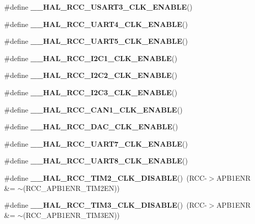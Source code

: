 \begin{DoxyCompactItemize}
\item 
\#define {\bfseries \+\_\+\+\_\+\+H\+A\+L\+\_\+\+R\+C\+C\+\_\+\+U\+S\+A\+R\+T3\+\_\+\+C\+L\+K\+\_\+\+E\+N\+A\+B\+LE}()
\item 
\#define {\bfseries \+\_\+\+\_\+\+H\+A\+L\+\_\+\+R\+C\+C\+\_\+\+U\+A\+R\+T4\+\_\+\+C\+L\+K\+\_\+\+E\+N\+A\+B\+LE}()
\item 
\#define {\bfseries \+\_\+\+\_\+\+H\+A\+L\+\_\+\+R\+C\+C\+\_\+\+U\+A\+R\+T5\+\_\+\+C\+L\+K\+\_\+\+E\+N\+A\+B\+LE}()
\item 
\#define {\bfseries \+\_\+\+\_\+\+H\+A\+L\+\_\+\+R\+C\+C\+\_\+\+I2\+C1\+\_\+\+C\+L\+K\+\_\+\+E\+N\+A\+B\+LE}()
\item 
\#define {\bfseries \+\_\+\+\_\+\+H\+A\+L\+\_\+\+R\+C\+C\+\_\+\+I2\+C2\+\_\+\+C\+L\+K\+\_\+\+E\+N\+A\+B\+LE}()
\item 
\#define {\bfseries \+\_\+\+\_\+\+H\+A\+L\+\_\+\+R\+C\+C\+\_\+\+I2\+C3\+\_\+\+C\+L\+K\+\_\+\+E\+N\+A\+B\+LE}()
\item 
\#define {\bfseries \+\_\+\+\_\+\+H\+A\+L\+\_\+\+R\+C\+C\+\_\+\+C\+A\+N1\+\_\+\+C\+L\+K\+\_\+\+E\+N\+A\+B\+LE}()
\item 
\#define {\bfseries \+\_\+\+\_\+\+H\+A\+L\+\_\+\+R\+C\+C\+\_\+\+D\+A\+C\+\_\+\+C\+L\+K\+\_\+\+E\+N\+A\+B\+LE}()
\item 
\#define {\bfseries \+\_\+\+\_\+\+H\+A\+L\+\_\+\+R\+C\+C\+\_\+\+U\+A\+R\+T7\+\_\+\+C\+L\+K\+\_\+\+E\+N\+A\+B\+LE}()
\item 
\#define {\bfseries \+\_\+\+\_\+\+H\+A\+L\+\_\+\+R\+C\+C\+\_\+\+U\+A\+R\+T8\+\_\+\+C\+L\+K\+\_\+\+E\+N\+A\+B\+LE}()
\item 
\mbox{\label{group___r_c_c_ex___peripheral___clock___enable___disable_gad2def81b1df0e62cd322ab60b31ba59f}} 
\#define {\bfseries \+\_\+\+\_\+\+H\+A\+L\+\_\+\+R\+C\+C\+\_\+\+T\+I\+M2\+\_\+\+C\+L\+K\+\_\+\+D\+I\+S\+A\+B\+LE}()~(R\+CC-\/$>$A\+P\+B1\+E\+NR \&= $\sim$(R\+C\+C\+\_\+\+A\+P\+B1\+E\+N\+R\+\_\+\+T\+I\+M2\+EN))
\item 
\mbox{\label{group___r_c_c_ex___peripheral___clock___enable___disable_ga9fb7035f007ec272b725e51018a36b23}} 
\#define {\bfseries \+\_\+\+\_\+\+H\+A\+L\+\_\+\+R\+C\+C\+\_\+\+T\+I\+M3\+\_\+\+C\+L\+K\+\_\+\+D\+I\+S\+A\+B\+LE}()~(R\+CC-\/$>$A\+P\+B1\+E\+NR \&= $\sim$(R\+C\+C\+\_\+\+A\+P\+B1\+E\+N\+R\+\_\+\+T\+I\+M3\+EN))
\item 
\mbox{\label{group___r_c_c_ex___peripheral___clock___enable___disable_ga8888dfd8a1e50f8019f581506ec776d8}} 

\end{DoxyCompactItemize}

